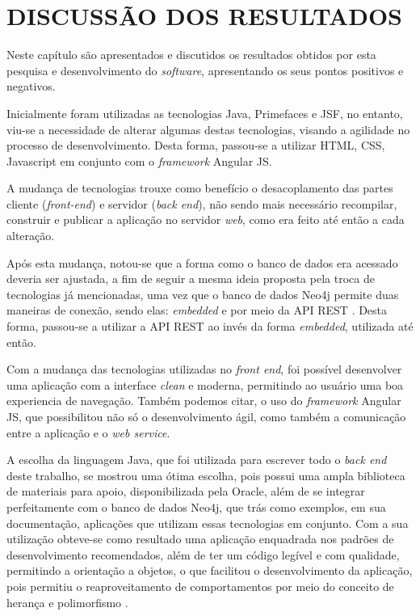 
\chapter{DISCUSSÃO DOS RESULTADOS} 

\par Neste capítulo são apresentados e discutidos os resultados obtidos por esta pesquisa e desenvolvimento do \textit{software}, apresentando os seus pontos positivos e negativos.

\par Inicialmente foram utilizadas as tecnologias Java, Primefaces e JSF, no entanto, viu-se a necessidade de alterar algumas destas tecnologias, visando a agilidade no processo de desenvolvimento. Desta forma, passou-se a utilizar HTML, CSS, Javascript em conjunto com o \textit{framework} Angular JS.

\par A mudança de tecnologias trouxe como benefício o desacoplamento das partes cliente (\textit{front-end}) e servidor (\textit{back end}), não sendo mais necessário recompilar, construir e publicar a aplicação no servidor \textit{web}, como era feito até então a cada alteração.

\par Após esta mudança, notou-se que a forma como o banco de dados era acessado deveria ser ajustada, a fim de seguir a mesma ideia proposta pela troca de tecnologias já mencionadas, uma vez que o banco de dados Neo4j permite duas maneiras de conexão, sendo elas: \textit{embedded} e por meio da API REST \cite{robinson_webber_eifrem_graph_databases}. Desta forma, passou-se a utilizar a API REST ao invés da forma \textit{embedded}, utilizada até então.

\par Com a mudança das tecnologias utilizadas no \textit{front end}, foi possível desenvolver uma aplicação com a interface \textit{clean} e moderna, permitindo ao usuário uma boa experiencia de navegação. Também podemos citar, o uso do \textit{framework} Angular JS, que possibilitou não só o desenvolvimento ágil, como também a comunicação entre a aplicação e o \textit{web service}.

\par A escolha da linguagem Java, que foi utilizada para escrever todo o \textit{back end} deste trabalho, se mostrou uma ótima escolha, pois possui uma ampla biblioteca de materiais para apoio, disponibilizada pela Oracle, além de se integrar perfeitamente com o banco de dados Neo4j, que trás como exemplos, em sua documentação, aplicações que utilizam essas tecnologias em conjunto. Com a sua utilização obteve-se como resultado uma aplicação enquadrada nos padrões de desenvolvimento recomendados, além de ter um código legível e com qualidade, permitindo a orientação a objetos, o que facilitou o desenvolvimento da aplicação, pois permitiu o reaproveitamento de comportamentos por meio do conceito de herança e polimorfismo \cite{schildt_java_complete_reference}.

